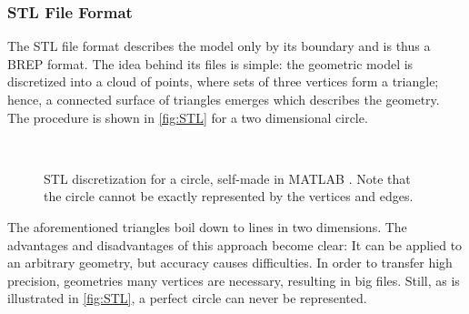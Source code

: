 \subsubsection{\acs{STL} File Format} \label{subsub:STL}
The \acf{STL} file format describes the model only by its boundary and is thus a \ac{BREP} format. The idea behind its files is simple: the geometric model is discretized into a cloud of points, where sets of three vertices form a triangle; hence, a connected surface of triangles emerges which describes the geometry. The procedure is shown in \autoref{fig:STL} for a two dimensional circle.  
\begin{figure}
\centering
   \\
   \caption{\ac{STL} discretization for a circle, self-made in MATLAB \cite{MATLAB}. Note that the circle cannot be exactly represented by the vertices and edges.}
   \label{fig:STL}
\end{figure}
The aforementioned triangles boil down to lines in two dimensions. The advantages and disadvantages of this approach become clear: It can be applied to an arbitrary geometry, but accuracy causes difficulties. In order to transfer high precision, geometries many vertices are necessary, resulting in big files. Still, as is illustrated in \autoref{fig:STL}, a perfect circle can never be represented. 

